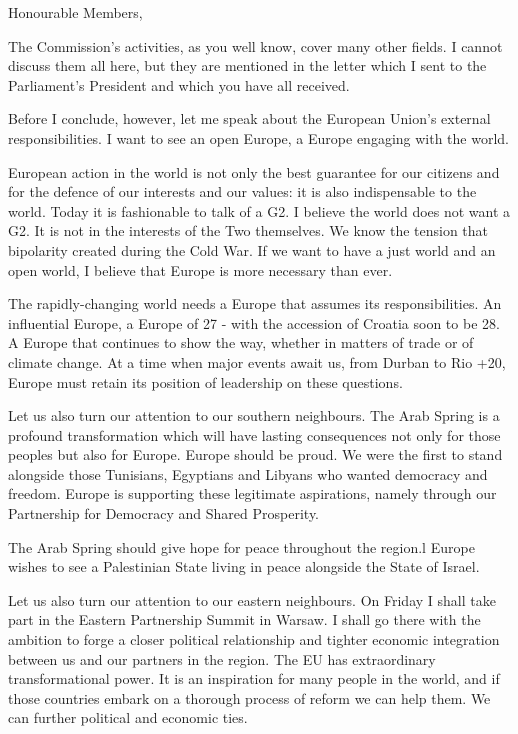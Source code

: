 \documentclass[a4paper,11pt]{article}
\begin{document}
Honourable Members,

The Commission's activities, as you well know, cover many other fields. I cannot discuss them all here, but they are mentioned in the letter which I sent to the Parliament's President and which you have all received.

Before I conclude, however, let me speak about the European Union's external responsibilities. I want to see an open Europe, a Europe engaging with the world.

European action in the world is not only the best guarantee for our citizens and for the defence of our interests and our values: it is also indispensable to the world. Today it is fashionable to talk of a G2. I believe the world does not want a G2. It is not in the interests of the Two themselves. We know the tension that bipolarity created during the Cold War. If we want to have a just world and an open world, I believe that Europe is more necessary than ever.

The rapidly-changing world needs a Europe that assumes its responsibilities. An influential Europe, a Europe of 27 - with the accession of Croatia soon to be 28. A Europe that continues to show the way, whether in matters of trade or of climate change. At a time when major events await us, from Durban to Rio +20, Europe must retain its position of leadership on these questions.

Let us also turn our attention to our southern neighbours. The Arab Spring is a profound transformation which will have lasting consequences not only for those peoples but also for Europe. Europe should be proud. We were the first to stand alongside those Tunisians, Egyptians and Libyans who wanted democracy and freedom. Europe is supporting these legitimate aspirations, namely through our Partnership for Democracy and Shared Prosperity.

The Arab Spring should give hope for peace throughout the region.l Europe wishes to see a Palestinian State living in peace alongside the State of Israel.

Let us also turn our attention to our eastern neighbours. On Friday I shall take part in the Eastern Partnership Summit in Warsaw. I shall go there with the ambition to forge a closer political relationship and tighter economic integration between us and our partners in the region. The EU has extraordinary transformational power. It is an inspiration for many people in the world, and if those countries embark on a thorough process of reform we can help them. We can further political and economic ties.
\end{document}
